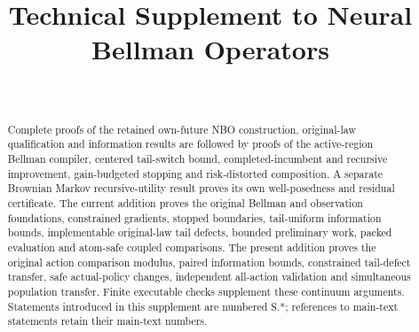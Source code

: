\documentclass[ecta,nameyear,draft]{econsocart}
\begin{document}
\begin{frontmatter}
\title{Technical Supplement to Neural Bellman Operators}
\begin{aug}
\author[id=au1,addressref={add1}]{~}
\address[id=add1]{Peking University}
\end{aug}
\begin{abstract}Complete proofs of the retained own-future NBO construction, original-law qualification and information results are followed by proofs of the active-region Bellman compiler, centered tail-switch bound, completed-incumbent and recursive improvement, gain-budgeted stopping and risk-distorted composition. A separate Brownian Markov recursive-utility result proves its own well-posedness and residual certificate. The current addition proves the original Bellman and observation foundations, constrained gradients, stopped boundaries, tail-uniform information bounds, implementable original-law tail defects, bounded preliminary work, packed evaluation and atom-safe coupled comparisons. The present addition proves the original action comparison modulus, paired information bounds, constrained tail-defect transfer, safe actual-policy changes, independent all-action validation and simultaneous population transfer. Finite executable checks supplement these continuum arguments. Statements introduced in this supplement are numbered S.*; references to main-text statements retain their main-text numbers.\end{abstract}
\end{frontmatter}





















\end{document}
